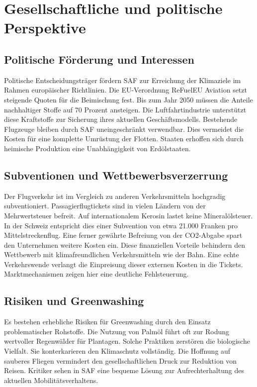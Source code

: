 \documentclass[12pt,a4paper]{article}
\begin{document}
\newpage
\section{Gesellschaftliche und politische Perspektive}

\subsection{Politische Förderung und Interessen}
Politische Entscheidungsträger fördern SAF zur Erreichung der Klimaziele im Rahmen europäischer Richtlinien. Die EU-Verordnung ReFuelEU Aviation setzt steigende Quoten für die Beimischung fest. Bis zum Jahr 2050 müssen die Anteile nachhaltiger Stoffe auf 70 Prozent ansteigen. Die Luftfahrtindustrie unterstützt diese Kraftstoffe zur Sicherung ihres aktuellen Geschäftsmodells. Bestehende Flugzeuge bleiben durch SAF uneingeschränkt verwendbar. Dies vermeidet die Kosten für eine komplette Umrüstung der Flotten. Staaten erhoffen sich durch heimische Produktion eine Unabhängigkeit von Erdölstaaten.

\subsection{Subventionen und Wettbewerbsverzerrung}
Der Flugverkehr ist im Vergleich zu anderen Verkehrsmitteln hochgradig subventioniert. Passagierflugtickets sind in vielen Ländern von der Mehrwertsteuer befreit. Auf internationalem Kerosin lastet keine Mineralölsteuer. In der Schweiz entspricht dies einer Subvention von etwa 21.000 Franken pro Mittelstreckenflug. Eine ferner gewährte Befreiung von der CO2-Abgabe spart den Unternehmen weitere Kosten ein. Diese finanziellen Vorteile behindern den Wettbewerb mit klimafreundlichen Verkehrsmitteln wie der Bahn. Eine echte Verkehrswende verlangt die Einpreisung dieser externen Kosten in die Tickets. Marktmechanismen zeigen hier eine deutliche Fehlsteuerung.

\subsection{Risiken und Greenwashing}
Es bestehen erhebliche Risiken für Greenwashing durch den Einsatz problematischer Rohstoffe. Die Nutzung von Palmöl führt oft zur Rodung wertvoller Regenwälder für Plantagen. Solche Praktiken zerstören die biologische Vielfalt. Sie konterkarieren den Klimaschutz vollständig. Die Hoffnung auf sauberes Fliegen vermindert den gesellschaftlichen Druck zur Reduktion von Reisen. Kritiker sehen in SAF eine bequeme Lösung zur Aufrechterhaltung des aktuellen Mobilitätsverhaltens. 
\end{document}
